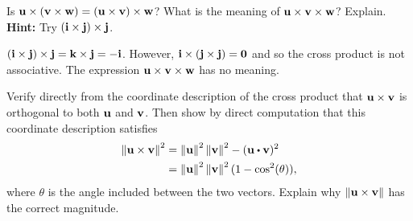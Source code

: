 \begin{ex}
  Is
  $\vect{u}\times (\vect{v}\times\vect{w}) = (\vect{u}\times
    \vect{v})\times\vect{w}$? What is the meaning of
  $\vect{u}\times \vect{v}\times\vect{w}$? Explain.  \textbf{Hint:}
  Try $(\vect{i}\times\vect{j})\times\vect{j}$.
  \begin{sol}
    $(\vect{i}\times\vect{j})\times\vect{j} = \vect{k}\times
    \vect{j}=-\vect{i}$. However,
    $\vect{i}\times(\vect{j}\times\vect{j}) = \vect{0}$ and so
    the cross product is not associative. The expression
    $\vect{u}\times\vect{v}\times\vect{w}$ has no meaning.
  \end{sol}
\end{ex}

\begin{ex}
  Verify directly from the coordinate description of the cross product
  that $\vect{u}\times \vect{v}$ is orthogonal to both $\vect{u}$ and
  $\vect{v}$. Then show by direct computation that this coordinate
  description satisfies
  \begin{align*}
    \norm{\vect{u}\times \vect{v}}^2
    & =\norm{\vect{u}
      }^2\norm{\vect{v}}^2-(\vect{u}\dotprod \vect{v})^2 \\
    & =\norm{\vect{u}}^2\norm{\vect{v}}^2(1-\cos^2(\theta)),
  \end{align*}
  where $\theta$ is the angle included between the two
  vectors. Explain why $\norm{\vect{u}\times\vect{v}}$ has the
  correct magnitude.
\end{ex}

